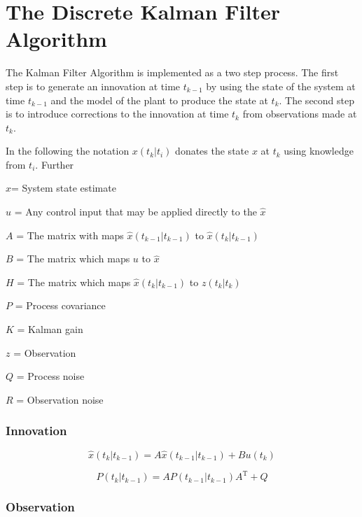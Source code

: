 \documentclass[a4paper]{report}
\numberwithin{equation}{chapter}
\begin{document}
\section[The Discrete Kalman Filter Algorithm]{The Discrete Kalman Filter Algorithm}

The Kalman Filter Algorithm is implemented as a two step process. The first step is to generate an innovation at time $t_{k-1}$ by using the state of the system at time $t_{k - 1}$ and the model of the plant to produce the state at $t_k$. The second step is to introduce corrections to the innovation at time $t_k$ from observations made at $t_k$.

\bigskip

In the following the notation $x \left( t_k|t_i \right)$ donates the state $x$ at $t_k$ using knowledge from $t_i$. Further

$\hat{x}$= System state estimate

$u$ = Any control input that may be applied directly to the $\hat{x}$

$A$ = The matrix with maps $\hat{x} \left( t_{k - 1}|t_{k - 1} \right)$ to $\hat{x} \left( t_k|t_{k - 1} \right)$

$B$ = The matrix which maps $u$ to $\hat{x}$

$H$ = The matrix which maps $\hat{x} \left( t_k|t_{k - 1} \right)$ to $z \left( t_k|t_k \right)$

$P$ = Process covariance

$K$ = Kalman gain

$z$ = Observation

$Q$ = Process noise

$R$ = Observation noise

\subsubsection[Innovation]{Innovation}

\begin{equation}
\hat{x} \left( t_k|t_{k-1} \right) = A\hat{x} \left( t_{k-1}|t_{k-1} \right) + Bu \left( t_k \right)
\end{equation}

\begin{equation}
P \left( t_k|t_{k-1} \right) = A P \left( t_{k-1}|t_{k-1} \right) A^{\mathrm{T}} + Q
\end{equation}

\subsubsection[Observation]{Observation}
\end{document}
